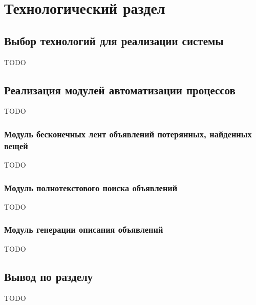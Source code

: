 \section{Технологический раздел}
\label{sec:technology}

\subsection{Выбор технологий для реализации системы}

TODO

\subsection{Реализация модулей автоматизации процессов}

TODO

\subsubsection{Модуль бесконечных лент объявлений потерянных, найденных вещей}

TODO

\subsubsection{Модуль полнотекстового поиска объявлений}

TODO

\subsubsection{Модуль генерации описания объявлений}

TODO

\subsection*{Вывод по разделу}

TODO